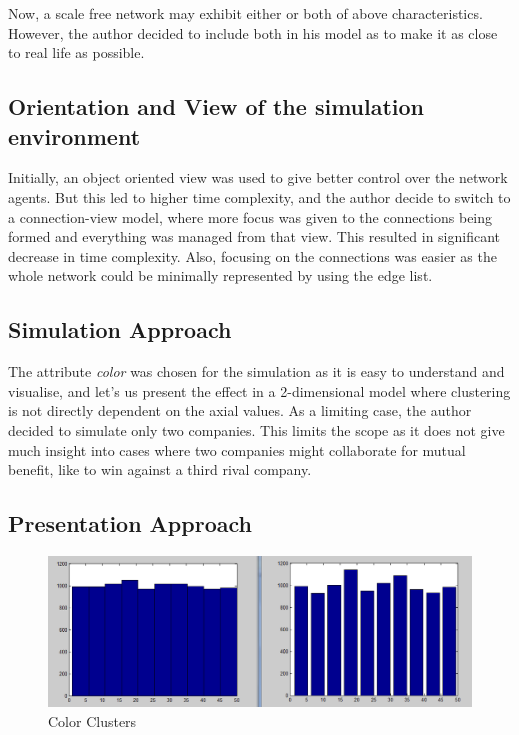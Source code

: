 Now, a scale free network may exhibit either or both of above characteristics. However, the author decided to include both in his model as to make it as close to real life as possible. 

\subsection{Orientation and View of the simulation environment}

Initially, an object oriented view was used to give better control over the network agents. But this led to higher time complexity, and the author decide to switch to a connection-view model, where more focus was given to the connections being formed and everything was managed from that view. This resulted in significant decrease in time complexity.
Also, focusing on the connections was easier as the whole network could be minimally represented by using the edge list.



\subsection{Simulation Approach}

The attribute \emph{color} was chosen for the simulation as it is easy to understand and visualise, and let's us present the effect in a 2-dimensional model where clustering is not directly dependent on the axial values. 
As a limiting case, the author decided to simulate only two companies. This limits the scope as it does not give much insight into cases where two companies might collaborate for mutual benefit, like to win against a third rival company.


\subsection{Presentation Approach}

\begin{figure}
\includegraphics[scale=0.5]{Figures/10000_4_m1_100000}
\caption{Color Clusters}
\label{fig:color_clusters}
\end{figure}


